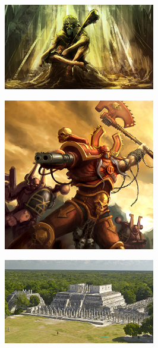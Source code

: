 \begin{figure}
	\begin{center}
		\includegraphics[width=\figwidth]{pics/6/35.png}
	\end{center}
\end{figure}

\begin{figure}
	\begin{center}
		\includegraphics[width=\figwidth]{pics/6/36.png}
	\end{center}
\end{figure}

\begin{figure}
	\begin{center}
		\includegraphics[width=\figwidth]{pics/6/37.png}
	\end{center}
\end{figure}

